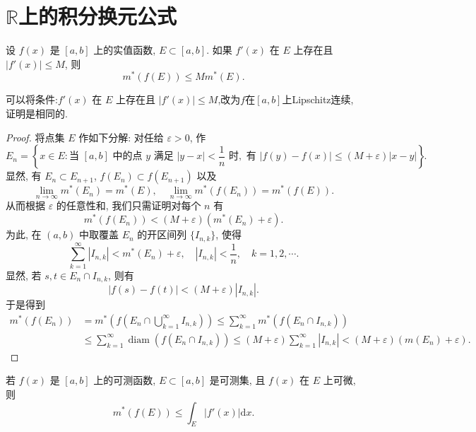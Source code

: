 \documentclass[../../main.tex]{subfiles}%
\begin{document}
\section{$\mathbb{R}$上的积分换元公式}

\begin{lemma}\label{lemma:实变函数--引理5.19}
设 $f(x)$ 是 $[a,b]$ 上的实值函数, $E\subset[a,b]$. 如果 $f'(x)$ 在 $E$ 上存在且 $|f'(x)|\leqslant M$, 则
\[
m^*(f(E)) \leqslant Mm^*(E). 
\]
\end{lemma}
\begin{remark}
可以将条件:$f'(x)$ 在 $E$ 上存在且 $|f'(x)|\leqslant M$,改为$f$在$[a,b]$上Lipschitz连续,证明是相同的.
\end{remark}
\begin{proof}

将点集 $E$ 作如下分解: 对任给 $\varepsilon>0$, 作
\[
E_n = \left\{x\in E: \text{当 } [a,b] \text{ 中的点 } y \text{ 满足 } |y-x|<\frac{1}{n} \text{ 时}, \text{ 有 } |f(y)-f(x)|\leqslant(M+\varepsilon)|x-y|\right\}.
\]
显然, 有 $E_n\subset E_{n+1}$, $f(E_n)\subset f(E_{n+1})$ 以及
\[
\lim_{n\to\infty}m^*(E_n) = m^*(E), \quad \lim_{n\to\infty}m^*(f(E_n)) = m^*(f(E)).
\]
从而根据 $\varepsilon$ 的任意性和, 我们只需证明对每个 $n$ 有
\[
m^*(f(E_n)) < (M+\varepsilon)(m^*(E_n)+\varepsilon).
\]
为此, 在 $(a,b)$ 中取覆盖 $E_n$ 的开区间列 $\{I_{n,k}\}$, 使得
\[
\sum_{k=1}^{\infty} |I_{n,k}| < m^*(E_n)+\varepsilon, \quad |I_{n,k}| < \frac{1}{n}, \quad k=1,2,\cdots.
\]
显然, 若 $s,t\in E_n\cap I_{n,k}$, 则有
\[
|f(s)-f(t)| < (M+\varepsilon)|I_{n,k}|.
\]
于是得到
\begin{align*}
m^*(f(E_n)) &= m^*\left(f\left(E_n\cap\bigcup_{k=1}^{\infty} I_{n,k}\right)\right) \leqslant \sum_{k=1}^{\infty} m^*(f(E_n\cap I_{n,k})) \\
&\leqslant \sum_{k=1}^{\infty} \operatorname{diam}(f(E_n\cap I_{n,k})) 
\leqslant (M+\varepsilon)\sum_{k=1}^{\infty} |I_{n,k}| < (M+\varepsilon)(m(E_n)+\varepsilon).
\end{align*}

\end{proof}

\begin{corollary}\label{corollary:可微的可测函数像集外测度小于导数积分}
若 $f(x)$ 是 $[a,b]$ 上的可测函数, $E\subset[a,b]$ 是可测集, 且 $f(x)$ 在 $E$ 上可微, 则
\[
m^*(f(E)) \leqslant \int_E |f'(x)|\mathrm{d}x. \label{5.17}
\]
\end{corollary}
\end{document}
